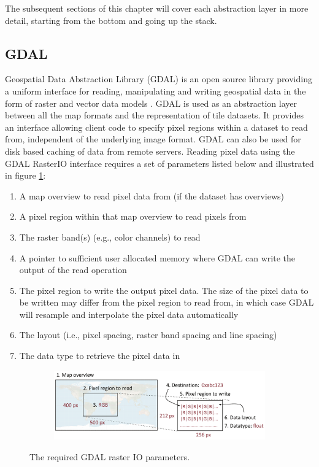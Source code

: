 The subsequent sections of this chapter will cover each abstraction layer in more detail, starting from the bottom and going up the stack.

\subsection{GDAL}
Geospatial Data Abstraction Library (GDAL) is an open source library providing a uniform interface for reading, manipulating and writing geospatial data in the form of raster and vector data models \cite{gdal}. GDAL is used as an abstraction layer between all the map formats and the representation of tile datasets. It provides an interface allowing client code to specify pixel regions within a dataset to read from, independent of the underlying image format. GDAL can also be used for disk based caching of data from remote servers. Reading pixel data using the GDAL RasterIO interface requires a set of parameters listed below and illustrated in figure \ref{fig:gdalio}:

\begin{enumerate}
	\item A map overview to read pixel data from (if the dataset has overviews)
	\item A pixel region within that map overview to read pixels from
	\item The raster band(s) (e.g., color channels) to read
	\item A pointer to sufficient user allocated memory where GDAL can write the output of the read operation
	\item The pixel region to write the output pixel data. The size of the pixel data to be written may differ from the pixel region to read from, in which case GDAL will resample and interpolate the pixel data automatically
	\item The layout (i.e., pixel spacing, raster band spacing and line spacing)
	\item The data type to retrieve the pixel data in
\end{enumerate}

\begin{figure}[htbp]
    \centering
    \begin{subfigure}[bt]{1.0\textwidth}
        \includegraphics[width=\textwidth]{figures/implementation/pipeline/gdalio.pdf}
    \end{subfigure}
    \caption{The required GDAL raster IO parameters.}
    \label{fig:gdalio}
\end{figure}

